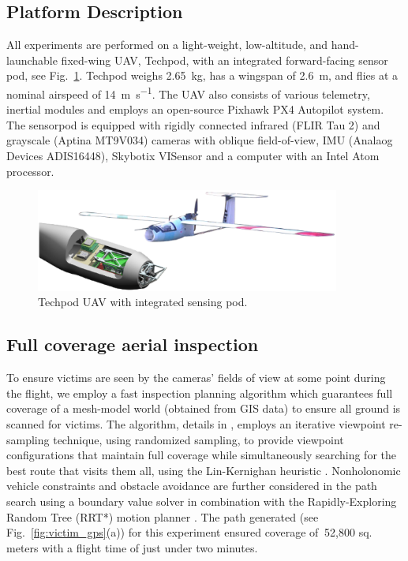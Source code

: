 \documentclass[runningheads]{llncs}
\begin{document}
\subsection{Platform Description}

All experiments are performed on a light-weight, low-altitude, and hand-launchable fixed-wing UAV, Techpod, with an integrated forward-facing sensor pod, see Fig.~\ref{fig:techpod}. Techpod weighs \SI{2.65}{\kilo\gram}, has a wingspan of \SI{2.6}{\meter}, and flies at a nominal airspeed of \SI{14}{\meter\per\second}. The UAV also consists of various telemetry, inertial modules and employs an open-source Pixhawk PX4 Autopilot \cite{meier2015px4} system. The sensorpod is equipped with rigidly connected infrared (FLIR Tau 2) and grayscale (Aptina MT9V034) cameras with oblique field-of-view, IMU (Analaog Devices ADIS16448), Skybotix VISensor \cite{Skybotix} and a computer with an Intel Atom processor.

\begin{figure}
\centerline{\includegraphics[width=10cm]{img/eps/techpod.eps}}
\caption{Techpod UAV with integrated sensing pod.}
\label{fig:techpod}
\end{figure}

\subsection{Full coverage aerial inspection}

To ensure victims are seen by the cameras' fields of view at some point during the flight, we employ a fast inspection planning algorithm which guarantees full coverage of a mesh-model world (obtained from GIS data) to ensure all ground is scanned for victims. The algorithm, details in \cite{7140101}, employs an iterative viewpoint re-sampling technique, using randomized sampling, to provide viewpoint configurations that maintain full coverage while simultaneously searching for the best route that visits them all, using the Lin-Kernighan heuristic \cite{lin1973effective}. Nonholonomic vehicle constraints and obstacle avoidance are further considered in the path search using a boundary value solver in combination with the Rapidly-Exploring Random Tree (RRT*) motion planner \cite{RRTS1a}. The path generated (see Fig.~\ref{fig:victim_gps}(a)) for this experiment ensured coverage of $~$52,800 sq. meters with a flight time of just under two minutes.
\end{document}
